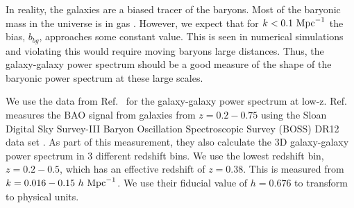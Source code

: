\documentclass[12pt,floats,floatfix,showpacs,amssymb,amsmath,prl,superscriptaddress,nofootinbib, aps]{revtex4-2}
\begin{document}
In reality, the galaxies are a biased tracer of the baryons. Most of the baryonic mass in the universe is in gas \citep{deGraaff2019}. However, we expect that for $k<0.1~\rm{Mpc}^{-1}$ the bias, $b_{bg}$, approaches some constant value. This is seen in numerical simulations \citep[e.g.,][]{Springel2018} and violating this would require moving baryons large distances. Thus, the galaxy-galaxy power spectrum should be a good measure of the shape of the baryonic power spectrum at these large scales.

We use the data from Ref.~\cite{Beutler2016} for the galaxy-galaxy power spectrum at low-z. Ref.~\cite{Beutler2016} measures the BAO signal from galaxies from $z=0.2-0.75$ using the Sloan Digital Sky Survey-III \citep[SDSS-III;][]{Eisenstein2011} Baryon Oscillation Spectroscopic Survey (BOSS) DR12 data set \citep{Dawson2013,Alam2015}. As part of this measurement, they also calculate the 3D galaxy-galaxy power spectrum in 3 different redshift bins. We use the lowest redshift bin, $z=0.2-0.5$, which has an effective redshift of $z=0.38$. This is measured from $k=0.016 - 0.15~h~\rm{Mpc}^{-1}$. We use their fiducial value of $h=0.676$ to transform to physical units.


\end{document}
